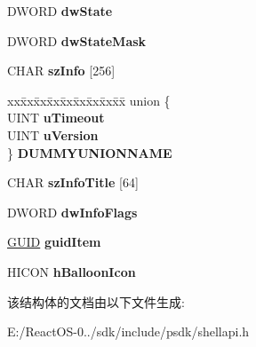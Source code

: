 \begin{DoxyCompactItemize}
D\+W\+O\+RD {\bfseries dw\+State}
\item 
\mbox{\label{struct___n_o_t_i_f_y_i_c_o_n_d_a_t_a_a_a7f53fe882eda461f45bffd94f08e3e94}} 
D\+W\+O\+RD {\bfseries dw\+State\+Mask}
\item 
\mbox{\label{struct___n_o_t_i_f_y_i_c_o_n_d_a_t_a_a_a43b4253b0e97ea25fedba59a2af0e8c4}} 
C\+H\+AR {\bfseries sz\+Info} \mbox{[}256\mbox{]}
\item 
\mbox{\label{struct___n_o_t_i_f_y_i_c_o_n_d_a_t_a_a_a1264f46942b57c26e0cf1353a0189a57}} 
\begin{tabbing}
xx\=xx\=xx\=xx\=xx\=xx\=xx\=xx\=xx\=\kill
union \{\\
\>UINT {\bfseries uTimeout}\\
\>UINT {\bfseries uVersion}\\
\} {\bfseries DUMMYUNIONNAME}\\

\end{tabbing}\item 
\mbox{\label{struct___n_o_t_i_f_y_i_c_o_n_d_a_t_a_a_a159713516c5a54b9335b3457a629bfb4}} 
C\+H\+AR {\bfseries sz\+Info\+Title} \mbox{[}64\mbox{]}
\item 
\mbox{\label{struct___n_o_t_i_f_y_i_c_o_n_d_a_t_a_a_a8b363e234979186371aeedf726064312}} 
D\+W\+O\+RD {\bfseries dw\+Info\+Flags}
\item 
\mbox{\label{struct___n_o_t_i_f_y_i_c_o_n_d_a_t_a_a_aae8b89ce029e6a12e1311507639443d3}} 
\hyperlink{interface_g_u_i_d}{G\+U\+ID} {\bfseries guid\+Item}
\item 
\mbox{\label{struct___n_o_t_i_f_y_i_c_o_n_d_a_t_a_a_af743673b42ef292407826777b33181cf}} 
H\+I\+C\+ON {\bfseries h\+Balloon\+Icon}
\end{DoxyCompactItemize}


该结构体的文档由以下文件生成\+:\begin{DoxyCompactItemize}
\item 
E\+:/\+React\+O\+S-\/0../sdk/include/psdk/shellapi.\+h\end{DoxyCompactItemize}
